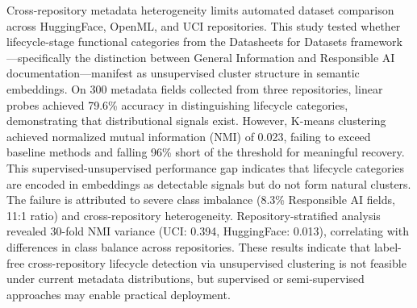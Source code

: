 
Cross-repository metadata heterogeneity limits automated dataset comparison across HuggingFace, OpenML, and UCI repositories. This study tested whether lifecycle-stage functional categories from the Datasheets for Datasets framework---specifically the distinction between General Information and Responsible AI documentation---manifest as unsupervised cluster structure in semantic embeddings. On 300 metadata fields collected from three repositories, linear probes achieved 79.6\% accuracy in distinguishing lifecycle categories, demonstrating that distributional signals exist. However, K-means clustering achieved normalized mutual information (NMI) of 0.023, failing to exceed baseline methods and falling 96\% short of the threshold for meaningful recovery. This supervised-unsupervised performance gap indicates that lifecycle categories are encoded in embeddings as detectable signals but do not form natural clusters. The failure is attributed to severe class imbalance (8.3\% Responsible AI fields, 11:1 ratio) and cross-repository heterogeneity. Repository-stratified analysis revealed 30-fold NMI variance (UCI: 0.394, HuggingFace: 0.013), correlating with differences in class balance across repositories. These results indicate that label-free cross-repository lifecycle detection via unsupervised clustering is not feasible under current metadata distributions, but supervised or semi-supervised approaches may enable practical deployment.

